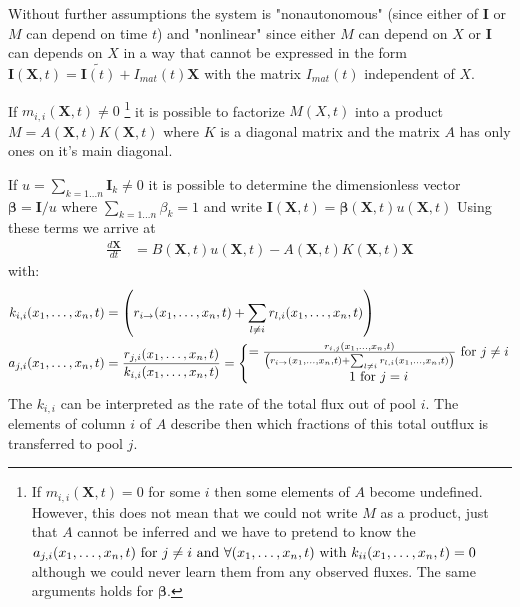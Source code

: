 \documentclass[journal abbreviation, manuscript]{copernicus}
\theoremstyle{definition}
\newcommand{\X}{\mathbf{X}}
\newcommand{\I}{\mathbf{I}}
\newcommand{\bv}{\bm{\beta}}
\begin{document}
Without further assumptions the system is "nonautonomous" (since either of $\I$ or $M$ can depend on time $t$) 
and "nonlinear" since either $M$ can depend on $X$ or $\I$ can depends on $X$ in a way that cannot be expressed in the form $\I(\X,t)=\tilde{\I(t)}+I_{mat}(t)\X$ with the matrix $I_{mat}(t)$ independent of $X$.

If $m_{i,i}(\X,t) \ne 0$ 
\footnote{
  If $m_{i,i}(\X,t) = 0 $ for some $i$ then some elements of $A$ become
  undefined. However, this does not mean that we could not write $M$ as a
  product, just that $A$ cannot be inferred and we have to pretend to know the
  $a_{j,i}(x_1, \dots, x_n, t) \text{ for } j\ne i \text{ and } \forall (x_1, \dots, x_n, t) \text{ with }
  k_{ii}(x_1, \dots, x_n, t)=0 $ although we could never learn them from any observed fluxes.
  The same arguments holds for $\bv$.
}
it is possible to factorize $M(X,t)$ into a product $M=A(\X,t) K(\X,t)$ where $K$ is
a diagonal matrix and the matrix $A$ has only ones on it's main diagonal. 

If $u=\sum_{k=1\dots n} \I_k \ne 0$ it is possible to determine the dimensionless vector $\bv = \I/u$ where $\sum_{k=1\dots n} \beta_k =1$ and write $\I(\X,t)=\bv(\X,t)u(\X,t)$ 
Using these terms  we arrive at 
\begin{align*}
\frac{d \X}{d t}&=B(\X,t) u(\X,t) - A(\X,t) K(\X,t) \X   
\end{align*}
\newcommand{\kiixt}{
      \left(
      r_{i \rightarrow } \xnt
      + 
      \sum_{l \ne i} r_{l,i} \xnt
      \right)
}
with:
\begin{align}
  k_{i,i}\xnt &=\kiixt \nonumber
  \\
  a_{j,i}\xnt
  &=\frac{r_{j,i}\xnt}{k_{i,i}\xnt}=
  \left\{
  \begin{matrix}
    =\frac{
    r_{i,j}\xnt 
  }{
    \kiixt
  } \text{ for } j \ne i
  \\
  1 \text{ for } j=i
  \end{matrix}
  \right.
  \label{aij}
\end{align}
The $k_{i,i}$ can be interpreted as the rate of the total flux out of pool $i$. The elements of column $i$ of $A$ describe then which fractions of this total outflux is transferred to pool $j$. 
\end{document}
